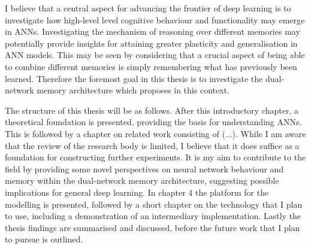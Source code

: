 I believe that a central aspect for advancing the frontier of deep learning is to investigate how high-level level cognitive behaviour and functionality may emerge in ANNs. Investigating the mechanism of reasoning over different memories may potentially provide insights for attaining greater plasticity and generalisation in ANN models. This may be seen by considering that a crucial aspect of being able to combine different memories is simply remembering what has previously been learned. Therefore the foremost goal in this thesis is to investigate the dual-network memory architecture which \cite{Hattori2014} proposes in this context.

The structure of this thesis will be as follows. After this introductory chapter, a theoretical foundation is presented, providing the basis for understanding ANNs. This is followed by a chapter on related work consisting of (...). While I am aware that the review of the research body is limited, I believe that it does suffice as a foundation for constructing further experiments. It is my aim to contribute to the field by providing some novel perspectives on neural network behaviour and memory within the dual-network memory architecture, suggesting possible implications for general deep learning. In chapter 4  the platform for the modelling is presented, followed by a short chapter on the technology that I plan to use, including a demonstration of an intermediary implementation. Lastly the thesis findings are summarised and discussed, before the future work that I plan to pursue is outlined.


\cleardoublepage